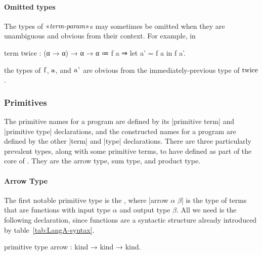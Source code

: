\newpage
\paragraph{Omitted types}
\label{sec:omitted-types}
The types of $\mvar{term-param}$s may sometimes be omitted when they are unambiguous and obvious from their context.
For example, in
\begin{program}
term twice : (α → α) → α → α ≔
  f a ⇒
    let a' = f a in
    f a'.
\end{program}
the types of $\code|f|$, $\code|a|$, and $\code|a'|$ are obvious from the immediately-previous type of $\code|twice|$.

\subsubsection{Primitives}

The primitive names for a program are defined by its \code|primitive term| and \code|primitive type| declarations, and
the constructed names for a program are defined by the other \code|term| and \code|type| declarations.
There are three particularly prevalent types, along with some primitive terms, to have defined as part of the core of \LangA.
They are the arrow type, sum type, and product type.

\paragraph{Arrow Type}
The first notable primitive type is the , where \code|arrow $α$ $β$| is the type of terms that are functions with input type $α$ and output type $β$.
All we need is the following declaration, since functions are a syntactic structure already introduced by table~\ref{tab:LangA-syntax}.
\begin{program}[caption={Primitive for the arrow type}]
primitive type arrow : kind → kind → kind.
\end{program}


